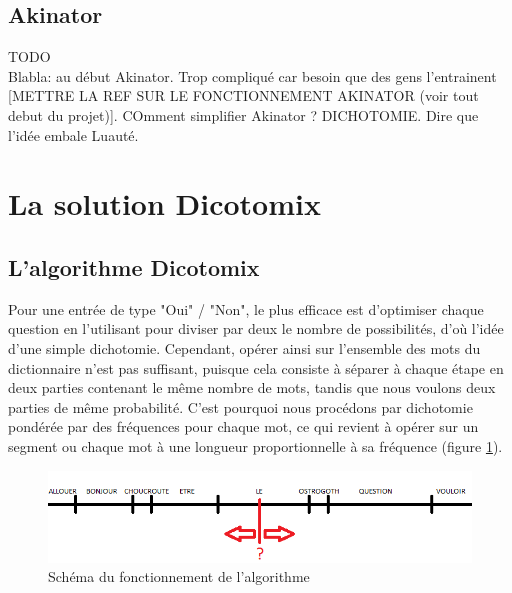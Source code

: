 \documentclass[11pt,a4paper]{article}
\theoremstyle{plain}
\theoremstyle{definition}
\begin{document}
\subsection{Akinator}

TODO\\

Blabla: au début Akinator. Trop compliqué car besoin que des gens l'entrainent [METTRE LA REF SUR LE FONCTIONNEMENT AKINATOR (voir tout debut du projet)]. 
COmment simplifier Akinator ? DICHOTOMIE. Dire que l'idée embale Luauté.


\section{La solution Dicotomix}
 
\subsection{L'algorithme Dicotomix}
Pour une entrée de type "Oui" / "Non", le plus efficace est d'optimiser chaque question en l'utilisant pour diviser par deux le nombre de possibilités, d'où l'idée d'une simple dichotomie.
Cependant, opérer ainsi sur l'ensemble des mots du dictionnaire n'est pas suffisant, puisque cela consiste à séparer à chaque étape en deux parties contenant le même nombre de mots, tandis que nous voulons deux parties de même probabilité. 
C'est pourquoi nous procédons par dichotomie pondérée par des fréquences pour chaque mot, ce qui revient à opérer sur un segment ou chaque mot à une longueur proportionnelle à sa fréquence (figure \ref{algo}).

\begin{figure}[h!]
\centering
\includegraphics[scale=0.6]{schema_algo.png}
\caption{Schéma du fonctionnement de l'algorithme}
\label{algo}
\end{figure}
\end{document}

